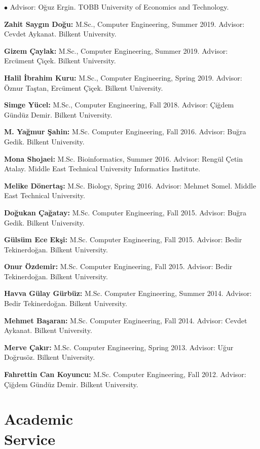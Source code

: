\documentclass[margin,line]{res}
\newenvironment{list2}{
  \begin{list}{$\bullet$}{%
      \setlength{\itemsep}{0.1cm}
      \setlength{\parsep}{0in} \setlength{\parskip}{0in}
      \setlength{\topsep}{0in} \setlength{\partopsep}{0in} 
      \setlength{\leftmargin}{0.2in}}}{\end{list}}
\begin{document}
\begin{resume}
\begin{list2}
  Advisor: Oğuz Ergin.
  TOBB University of Economics and Technology.
\item
{\bf  Zahit Saygın Doğu:} M.Sc., Computer Engineering, Summer 2019.
  Advisor: Cevdet Aykanat.
  Bilkent University.
  \item
{\bf  Gizem Çaylak:} M.Sc., Computer Engineering, Summer 2019.
  Advisor: Ercüment Çiçek.
  Bilkent University.
\item
{\bf  Halil İbrahim Kuru:} M.Sc., Computer Engineering, Spring 2019.
  Advisor: Öznur Taştan, Ercüment Çiçek.
  Bilkent University.
\item
  {\bf Simge Yücel:} M.Sc., Computer Engineering, Fall 2018.
  Advisor: Çiğdem Gündüz Demir.
  Bilkent University.
\item
  {\bf M. Yağmur Şahin:} M.Sc. Computer Engineering, Fall 2016. Advisor: Buğra Gedik.
  Bilkent University. 
\item
  {\bf Mona Shojaei:} M.Sc. Bioinformatics,  Summer 2016. Advisor: Rengül Çetin Atalay.
  Middle East Technical University Informatics Institute.
\item
  {\bf Melike Dönertaş:} M.Sc. Biology, Spring 2016. Advisor: Mehmet Somel.
  Middle East Technical University. 
\item
  {\bf Doğukan Çağatay:} M.Sc. Computer Engineering,  Fall 2015. Advisor: Buğra Gedik.
  Bilkent University. 
\item
  {\bf Gülsüm Ece Ekşi:} M.Sc. Computer Engineering,  Fall 2015. Advisor: Bedir Tekinerdoğan.
  Bilkent University. 
\item
  {\bf Onur Özdemir:} M.Sc. Computer Engineering,  Fall 2015. Advisor: Bedir Tekinerdoğan.
  Bilkent University. 
\item
  {\bf Havva Gülay Gürbüz:} M.Sc. Computer Engineering, Summer 2014. Advisor: Bedir Tekinerdoğan.
  Bilkent University. 
 \item
  {\bf Mehmet Başaran:} M.Sc. Computer Engineering, Fall 2014. Advisor: Cevdet Aykanat.
  Bilkent University. 
\item
  {\bf Merve Çakır:} M.Sc. Computer Engineering, Spring 2013. Advisor: Uğur Doğrusöz.
  Bilkent University.
\item
  {\bf Fahrettin Can Koyuncu:} M.Sc. Computer Engineering, Fall 2012. Advisor: Çiğdem Gündüz Demir.
  Bilkent University. 
  \end{list2}



\vspace*{-.2cm}
\section{\sc Academic \\ Service}
\vspace{-0.3cm}

\end{resume}
\end{document}
